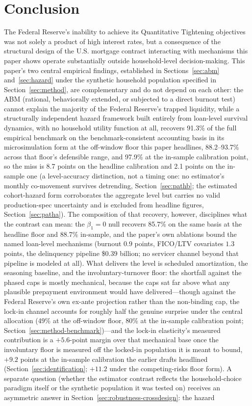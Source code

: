 \documentclass[12pt]{article}
\begin{document}
\section{Conclusion}\label{sec:conclusion}

The Federal Reserve's inability to achieve its Quantitative Tightening objectives was not solely a product of high interest rates, but a consequence of the structural design of the U.S. mortgage contract interacting with mechanisms this paper shows operate substantially outside household-level decision-making. This paper's two central empirical findings, established in Sections~\ref{sec:abm} and~\ref{sec:hazard} under the synthetic household population specified in Section~\ref{sec:method}, are complementary and do not depend on each other: the ABM (rational, behaviorally extended, or subjected to a direct burnout test) cannot explain the majority of the Federal Reserve's trapped liquidity, while a structurally independent hazard framework built entirely from loan-level survival dynamics, with no household utility function at all, recovers 91.3\% of the full empirical benchmark on the benchmark-consistent accounting basis in its microsimulation form at the off-window floor this paper headlines, 88.2--93.7\% across that floor's defensible range, and 97.9\% at the in-sample calibration point, so the miss is 8.7 points on the headline calibration and 2.1 points on the in-sample one (a level-accuracy distinction, not a timing one: no estimator's monthly co-movement survives detrending, Section~\ref{sec:pathb}; the estimated cohort-hazard form corroborates the aggregate level but carries no valid production-spec uncertainty and is excluded from headline figures, Section~\ref{sec:patha}). The composition of that recovery, however, disciplines what the contrast can mean: the $\beta_1 = 0$ null recovers 85.7\% on the same basis at the headline floor and 88.7\% in-sample, and the paper's own ablations bound the named loan-level mechanisms (burnout $0.9$ points, FICO/LTV covariates $1.3$ points, the delinquency pipeline \$0.39 billion; no servicer channel beyond that pipeline is modeled at all). What delivers the level is scheduled amortization, the seasoning baseline, and the involuntary-turnover floor: the shortfall against the phased caps is mostly mechanical, because the caps sat far above what any plausible prepayment environment would have delivered---though against the Federal Reserve's own ex-ante projection rather than the non-binding cap, the lock-in channel accounts for roughly half the genuine surprise under the central allocation (49\% at the off-window floor, 80\% at the in-sample calibration point; Section~\ref{sec:method-benchmark})---and the lock-in elasticity's measured contribution is a $+5.6$-point margin over that mechanical base once the involuntary floor is measured off the locked-in population it is meant to bound, $+9.2$ points at the in-sample calibration the earlier drafts headlined (Section~\ref{sec:identification}; $+11.2$ under the competing-risks floor form). A separate question (whether the estimator contrast reflects the household-choice paradigm itself or the synthetic population it was tested on) receives an asymmetric answer in Section~\ref{sec:robustness-crossdesign}: the hazard 
\end{document}
